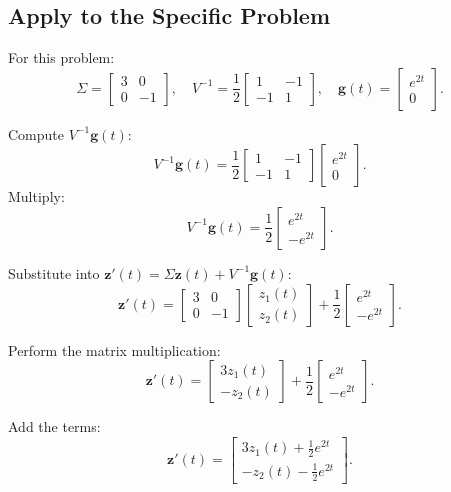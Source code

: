 \documentclass[12pt]{article}
\begin{document}
\subsection*{Apply to the Specific Problem}
For this problem:
\[
\Sigma = \begin{bmatrix} 3 & 0 \\ 0 & -1 \end{bmatrix}, \quad
V^{-1} = \frac{1}{2}\begin{bmatrix} 1 & -1 \\ -1 & 1 \end{bmatrix}, \quad
\mathbf{g}(t) = \begin{bmatrix} e^{2t} \\ 0 \end{bmatrix}.
\]

Compute \( V^{-1}\mathbf{g}(t) \):
\[
V^{-1}\mathbf{g}(t) = \frac{1}{2}\begin{bmatrix} 1 & -1 \\ -1 & 1 \end{bmatrix}\begin{bmatrix} e^{2t} \\ 0 \end{bmatrix}.
\]
Multiply:
\[
V^{-1}\mathbf{g}(t) = \frac{1}{2}\begin{bmatrix} e^{2t} \\ -e^{2t} \end{bmatrix}.
\]

Substitute into \( \mathbf{z}'(t) = \Sigma\mathbf{z}(t) + V^{-1}\mathbf{g}(t) \):
\[
\mathbf{z}'(t) = \begin{bmatrix} 3 & 0 \\ 0 & -1 \end{bmatrix}\begin{bmatrix} z_1(t) \\ z_2(t) \end{bmatrix} + \frac{1}{2}\begin{bmatrix} e^{2t} \\ -e^{2t} \end{bmatrix}.
\]

Perform the matrix multiplication:
\[
\mathbf{z}'(t) = \begin{bmatrix} 3z_1(t) \\ -z_2(t) \end{bmatrix} + \frac{1}{2}\begin{bmatrix} e^{2t} \\ -e^{2t} \end{bmatrix}.
\]

Add the terms:
\[
\mathbf{z}'(t) = \begin{bmatrix} 3z_1(t) + \frac{1}{2}e^{2t} \\ -z_2(t) - \frac{1}{2}e^{2t} \end{bmatrix}.
\]
\end{document}
